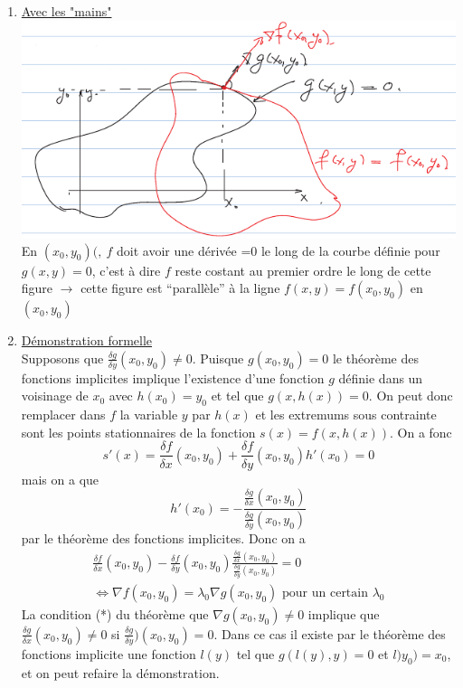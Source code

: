 \documentclass[12pt,a4paper]{article}
\begin{document}
\begin{enumerate}
	\item 	\uline{Avec les "mains"}\\
			\includegraphics[scale=0.7]{images/avec_mains}\\
			En $(x_0,y_0)(,\ f$ doit avoir une dérivée =0 le long de la courbe définie pour $g(x,y) =0$, c'est à dire $f$ reste costant au premier ordre le long de cette figure $\to$ cette figure est \enquote{parallèle} à la ligne $f(x,y) = f(x_0,y_0)$ en $(x_0,y_0)$
	
	\item 	\uline{Démonstration formelle}\\
			Supposons que $\frac{\delta g}{\delta y}(x_0,y_0) \neq 0$. Puisque $g(x_0,y_0) = 0$ le théorème  des fonctions implicites implique l'existence d'une fonction $g$ définie dans un voisinage de $x_0$ avec $h(x_0) = y_0$ et tel que $g(x,h(x)) = 0$. On peut donc remplacer dans $f$ la variable $y$ par $h(x)$ et les extremums sous contrainte sont les points stationnaires de la fonction  $s(x) = f(x,h(x))$. On a fonc 
			\begin{equation*}
				s'(x) = \frac{\delta f}{\delta x} (x_0,y_0) +  \frac{\delta f}{\delta y}(x_0,y_0) h'(x_0) = 0
			\end{equation*}
			mais on a que
			\begin{equation*}
				h'(x_0) = -\frac{\frac{\delta g}{\delta x} (x_0,y_0)}{\frac{\delta g}{\delta y} (x_0,y_0)}
			\end{equation*}
			par le théorème des fonctions implicites. Donc on a 
			\begin{align*}
				\frac{ \delta f}{\delta x} (x_0,y_0) - \frac{\delta f}{\delta y}(x_0,y_0) \frac{\frac{\delta g}{\delta x}(x_0,y_0)}{\frac{\delta g}{\delta y}(x_0,y_0)} = 0\\
				\iff \nabla f(x_0,y_0) = \lambda_0 \nabla g(x_0,y_0) \text{ pour un certain } \lambda_0
			\end{align*}
			 La condition (*) du théorème que $\nabla g(x_0,y_0) \neq 0$ implique que $\frac{\delta g}{\delta x}(x_0,y_0) \neq 0$ si $\frac{\delta g}{\delta y})(x_0,y_0) = 0$. Dans ce cas il existe par le théorème des fonctions implicite une fonction $l(y)$ tel que $g(l(y),y) = 0$ et $l)y_0) = x_0$, et on peut refaire la démonstration.
\end{enumerate}
\end{document}

